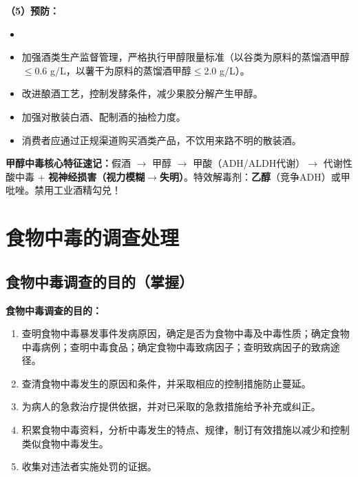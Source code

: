 \begin{keybox}
\textbf{（5）预防：}
\begin{itemize}[leftmargin=*]
    \item {}
    \item 加强酒类生产监督管理，严格执行甲醇限量标准（以谷类为原料的蒸馏酒甲醇$\leq$0.6 g/L，以薯干为原料的蒸馏酒甲醇$\leq$2.0 g/L）。
    \item 改进酿酒工艺，控制发酵条件，减少果胶分解产生甲醇。
    \item 加强对散装白酒、配制酒的抽检力度。
    \item 消费者应通过正规渠道购买酒类产品，不饮用来路不明的散装酒。
\end{itemize}
\end{keybox}

\begin{exambox}
\textbf{甲醇中毒核心特征速记：}假酒 $\to$ 甲醇 $\to$ 甲酸（ADH/ALDH代谢）$\to$ 代谢性酸中毒 + \textbf{视神经损害（视力模糊$\to$失明）}。特效解毒剂：\textbf{乙醇}（竞争ADH）或甲吡唑。禁用工业酒精勾兑！
\end{exambox}

\section{食物中毒的调查处理}

\subsection{食物中毒调查的目的（掌握）}

\begin{keybox}
\textbf{食物中毒调查的目的：}
\begin{enumerate}[leftmargin=*]
    \item 查明食物中毒暴发事件发病原因，确定是否为食物中毒及中毒性质；确定食物中毒病例；查明中毒食品；确定食物中毒致病因子；查明致病因子的致病途径。
    \item 查清食物中毒发生的原因和条件，并采取相应的控制措施防止蔓延。
    \item 为病人的急救治疗提供依据，并对已采取的急救措施给予补充或纠正。
    \item 积累食物中毒资料，分析中毒发生的特点、规律，制订有效措施以减少和控制类似食物中毒发生。
    \item 收集对违法者实施处罚的证据。
\end{enumerate}
\end{keybox}


